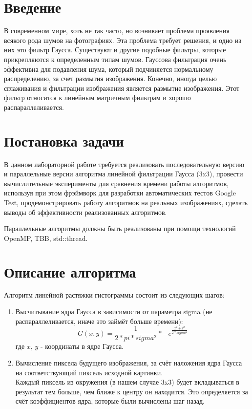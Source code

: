 \documentclass{report}
\begin{document}
\setcounter{page}{2}

\tableofcontents
\newpage

\section*{Введение}
\par В современном мире, хоть не так часто, но возникает проблема проявления всякого рода шумов на фотографиях. Эта проблема требует решения, и одно из них это фильтр Гаусса. Существуют и другие подобные фильтры, которые прикрепляются к определенным типам шумов. Гауссова фильтрация очень эффективна для подавления шума, который подчиняется нормальному распределению, за счет размытия изображения. Конечно, иногда целью сглаживания и фильтрации изображения является размытие изображения. Этот фильтр относится к линейным матричным фильтрам и хорошо распараллеливается.
\newpage

\section*{Постановка задачи}
\par В данном лабораторной работе требуется реализовать последовательную версию и параллельные версии алгоритма линейной фильтрации Гаусса (3x3), провести вычислительные эксперименты для сравнения времени работы алгоритмов, используя при этом фрэймворк для разработки автоматических тестов Google Test, продемонстрировать работу алгоритмов на реальных изображениях, сделать выводы об эффективности реализованных алгоритмов.
\par Параллельные алгоритмы должны быть реализованы при помощи технологий OpenMP, TBB, std::thread.
\newpage

\section*{Описание алгоритма}
\par Алгоритм линейной растяжки гистограммы состоит из следующих шагов:
\begin{enumerate}
\item Высчитывание ядра Гаусса в зависимости от параметра sigma (не распараллеливается, иначе это займёт больше времени): $$G(x,y) = \frac{1}{2*pi*sigma^2} * -e^\frac{x^2 + y^2}{2*sigma^2}$$
где $x$, $y$ - координаты в ядре Гаусса.
\item Вычисление пиксела будущего изображения, за счёт наложения ядра Гаусса на соответствующий пиксель исходной картинки.\\
Каждый пиксель из окружения (в нашем случае 3x3) будет вкладываться в результат тем больше, чем ближе к центру он находится. Это определяется за счёт коэффициентов ядра, которые были вычислены шаг назад.
\end{enumerate}
\newpage
\end{document}
